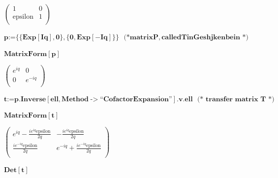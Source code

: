 {\begin{doublespace}
\noindent\(\left(
\begin{array}{cc}
 1 & 0 \\
 \text{epsilon} & 1 \\
\end{array}
\right)\)
\end{doublespace}

\begin{doublespace}
\noindent\(\pmb{p\text{:=}\{\{\text{Exp}[I q],0\},\{0,\text{Exp}[-I q]\}\}\text{    }\text{(*} \text{matrix} P, \text{called} T \text{in} \text{Geshjkenbein}\text{
 }\text{*)} }\)
\end{doublespace}

\begin{doublespace}
\noindent\(\pmb{\text{MatrixForm}[p]}\)
\end{doublespace}

\begin{doublespace}
\noindent\(\left(
\begin{array}{cc}
 e^{i q} & 0 \\
 0 & e^{-i q} \\
\end{array}
\right)\)
\end{doublespace}

\begin{doublespace}
\noindent\(\pmb{t\text{:=}p.\text{Inverse}[\text{ell},\text{Method}\text{-$>$}\text{{``}CofactorExpansion{''}}].v.\text{ell}\text{   }\text{(* transfer
matrix T *)}}\)
\end{doublespace}

\begin{doublespace}
\noindent\(\pmb{\text{MatrixForm}[t]}\)
\end{doublespace}

\begin{doublespace}
\noindent\(\left(
\begin{array}{cc}
 e^{i q}-\frac{i e^{i q} \text{epsilon}}{2 q} & -\frac{i e^{i q} \text{epsilon}}{2 q} \\
 \frac{i e^{-i q} \text{epsilon}}{2 q} & e^{-i q}+\frac{i e^{-i q} \text{epsilon}}{2 q} \\
\end{array}
\right)\)
\end{doublespace}

\begin{doublespace}
\noindent\(\pmb{\text{Det}[t]}\)
\end{doublespace}

}
